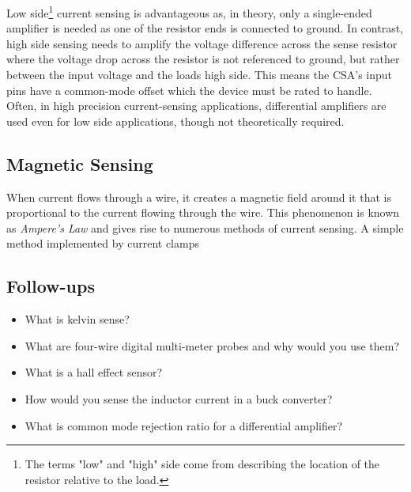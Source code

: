 \documentclass[main.tex]{subfiles}
\begin{document}
\noindent Low side\footnote{The terms "low" and "high" side come from describing the location of the resistor relative to the load.} current sensing is advantageous as, in theory, only a single-ended amplifier is needed as one of the resistor ends is connected to ground. In contrast, high side sensing needs to amplify the voltage difference across the sense resistor where the voltage drop across the resistor is not referenced to ground, but rather between the input voltage and the loads high side. This means the CSA's input pins have a common-mode offset which the device must be rated to handle. Often, in high precision current-sensing applications, differential amplifiers are used even for low side applications, though not theoretically required. 

\subsection{Magnetic Sensing}
When current flows through a wire, it creates a magnetic field around it that is proportional to the current flowing through the wire. This phenomenon is known as \textit{Ampere's Law} and gives rise to numerous methods of current sensing. A simple method implemented by current clamps 


\subsection{Follow-ups}
\begin{itemize}
    \item What is kelvin sense? 
    \item What are four-wire digital multi-meter probes and why would you use them?
    \item What is a hall effect sensor?
    \item How would you sense the inductor current in a buck converter?
    \item What is common mode rejection ratio for a differential amplifier?
\end{itemize}
\end{document}
